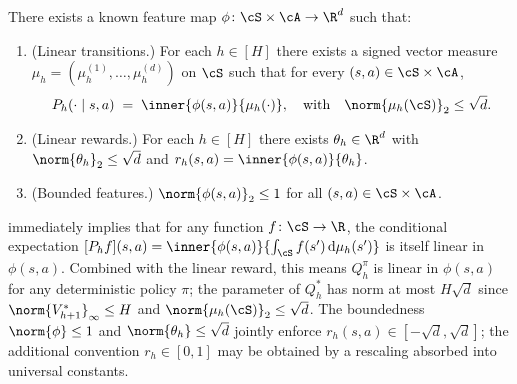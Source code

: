 \begin{assumption}\label{ass:linear_mdp}
There exists a known feature map $\phi \colon \cS \times \cA \to \R^d$ such that:
\begin{enumerate}[label=(\roman*), leftmargin=2em, itemsep=0.2em]
    \item \label{ass:linear_mdp:trans} (Linear transitions.) For each $h \in [H]$ there exists a signed vector measure $\mu_h = (\mu_h^{(1)}, \ldots, \mu_h^{(d)})$ on $\cS$ such that for every $(s, a) \in \cS \times \cA$,
    \begin{align*}
    P_h(\cdot \mid s, a) \;=\; \inner{\phi(s, a)}{\mu_h(\cdot)},
    \quad \text{with}\quad \norm{\mu_h(\cS)}_2 \le \sqrt{d}.
    \end{align*}
    \item \label{ass:linear_mdp:rew} (Linear rewards.) For each $h \in [H]$ there exists $\theta_h \in \R^d$ with $\norm{\theta_h}_2 \le \sqrt{d}$ and $r_h(s, a) = \inner{\phi(s, a)}{\theta_h}$.
    \item \label{ass:linear_mdp:feat} (Bounded features.) $\norm{\phi(s, a)}_2 \le 1$ for all $(s, a) \in \cS \times \cA$.
\end{enumerate}
\end{assumption}

\begin{remark}\label{rem:linear_mdp_consequences}
 immediately implies that for any function $f \colon \cS \to \R$, the conditional expectation $[P_h f](s, a) = \inner{\phi(s, a)}{\int_\cS f(s')\, \mathrm{d}\mu_h(s')}$ is itself linear in $\phi(s, a)$. Combined with the linear reward, this means $Q_h^\pi$ is linear in $\phi(s, a)$ for any deterministic policy $\pi$; the parameter of $Q_h^*$ has norm at most $H \sqrt{d}$ since $\norm{V_{h+1}^*}_\infty \le H$ and $\norm{\mu_h(\cS)}_2 \le \sqrt{d}$. The boundedness $\norm{\phi} \le 1$ and $\norm{\theta_h} \le \sqrt{d}$ jointly enforce $r_h(s, a) \in [-\sqrt{d}, \sqrt{d}]$; the additional convention $r_h \in [0, 1]$ may be obtained by a rescaling absorbed into universal constants.
\end{remark}

